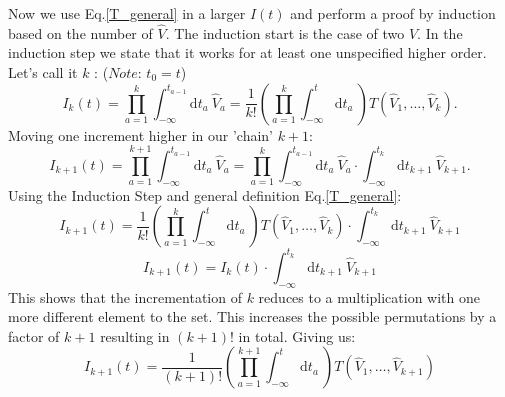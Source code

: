 \documentclass[12pt, titlepage]{article}
\begin{document}
\begin{subappendices}
Now we use Eq.\enskip\eqref{T_general} in a larger $ I(t) $ and perform a proof by induction based on the number of $ \hat{V} $. The induction start is the case of two $ \hat{V} $. In the induction step we state that it works for at least one unspecified higher order. Let's call it $ k $ : ($ \textit{Note:} $ $ t_0 = t $)\\
\begin{equation}
I_k (t)
=
 \prod_{a=1}^{k} 
 \int_{-\infty}^{t_{a-1}}\mathrm{d}t_a\
  \hat{V}_a
=
\dfrac{1}{k!}
 (
 \prod_{a=1}^{k} 
\int_{-\infty}^{t}\mathrm{d}t_a\
)
T(\hat{V}_1,\ldots,\hat{V}_k).
\end{equation}
Moving one increment higher in our 'chain' $ k+1 $:
\begin{equation}
I_{k+1} (t)
=
 \prod_{a=1}^{k+1} 
 \int_{-\infty}^{t_{a-1}}\mathrm{d}t_a\
  \hat{V}_a
  =
   \prod_{a=1}^{k} 
 \int_{-\infty}^{t_{a-1}}\mathrm{d}t_a\
  \hat{V}_a
  \cdot
 \int_{-\infty}^{t_{k}}\mathrm{d}t_{k+1}\
 \hat{V}_{k+1}.
\end{equation}
Using the Induction Step and general definition Eq.\enskip\eqref{T_general}:
\begin{equation}
I_{k+1} (t)
=
\dfrac{1}{k!}
 (
 \prod_{a=1}^{k} 
\int_{-\infty}^{t}\mathrm{d}t_a\
)
T(\hat{V}_1,\ldots,\hat{V}_k)
\cdot
 \int_{-\infty}^{t_{k}}\mathrm{d}t_{k+1}\
 \hat{V}_{k+1}
\end{equation}
\begin{equation}
I_{k+1} (t)
=
I_k (t)
\cdot
 \int_{-\infty}^{t_{k}}\mathrm{d}t_{k+1}\
 \hat{V}_{k+1}
\end{equation}
This shows that the incrementation of $ k $ reduces to a multiplication with one more different element to the set. This increases the possible permutations by a factor of $ k+1 $ resulting in $ (k+1)! $ in total. Giving us:
\begin{equation}
I_{k+1}(t)
=
\dfrac{1}{(k+1)!}
 (
 \prod_{a=1}^{k+1} 
\int_{-\infty}^{t}\mathrm{d}t_a\
)
T(\hat{V}_1,\ldots,\hat{V}_{k+1})
\end{equation}


\end{subappendices}
\end{document}
